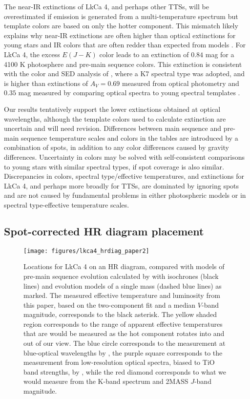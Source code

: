 \documentclass[twocolumn]{emulateapj}%
\begin{document}
The near-IR extinctions of LkCa 4, and perhaps other TTSs, will be overestimated if emission is generated from a multi-temperature spectrum but template colors are based on only the hotter component.  This mismatch likely explains why near-IR extinctions are often higher than optical extinctions for young stars \citep{herczeg14} and IR colors that are often redder than expected from models \citep{tottle15}.  For LkCa 4, the excess $E(J-K)$ color leads to an extinction of $0.84$ mag for a 4100 K photosphere and \citet{pecaut13} pre-main sequence colors.  This extinction is consistent with the color and SED analysis of \citet{furlan06}, where a K7 spectral type was adopted, and is higher than extinctions of $A_V=0.69$ measured from optical photometry \citep{kenyon95} and $0.35$ mag measured by comparing optical spectra to young spectral templates \citep{herczeg14}.  


Our results tentatively support the lower extinctions obtained at optical wavelengths, although the template colors used to calculate extinction are uncertain and will need revision.  Differences between main sequence and pre-main sequence temperature scales and colors in the \citet{pecaut13} tables are introduced by a combination of spots, in addition to any color differences caused by gravity differences.
Uncertainty in colors may be solved with self-consistent comparisons to young stars with similar spectral types, if spot coverage is also similar.  Discrepancies in colors, spectral type/effective temperatures, and extinctions for LkCa 4, and perhaps more broadly for TTSs, are dominated by ignoring spots and are not caused by fundamental problems in either photospheric models or in spectral type-effective temperature scales.


\subsection{Spot-corrected HR diagram placement}

\begin{figure*}
 \centering
 \texttt{[image: figures/lkca4\_hrdiag\_paper2]}
 \caption{Locations for LkCa 4 on an HR diagram, compared with models of pre-main sequence evolution calculated by \citet{baraffe15} with isochrones (black lines) and evolution models of a single mass (dashed blue lines) as marked.  The measured effective temperature and luminosity from this paper, based on the two-component fit and a median $V$-band magnitude, corresponds to the black asterisk.  The yellow shaded region corresponds to the range of apparent effective temperatures that are would be measured as the hot component rotates into and out of our view.  The blue circle corresponds to the measurement at blue-optical wavelengths by \citet{donati14}, the purple square corresponds to the measurement from low-resolution optical spectra, biased to TiO band strengths, by \citet[][biased to]{herczeg14}, while the red diamond corresponds to what we would measure from the K-band spectrum and 2MASS $J$-band magnitude.}
 \label{fig:hrdiag}
\end{figure*}
\end{document}
